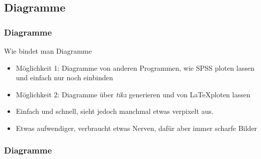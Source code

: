 \subsection{Diagramme}
\begin{frame}
  \frametitle{Diagramme}

  \begin{block}{Wie bindet man Diagramme}
    \begin{itemize}[<+->]
      \item Möglichkeit 1: Diagramme von anderen Programmen, wie SPSS ploten lassen und einfach nur noch einbinden
      \item Möglichkeit 2: Diagramme über \textit{tikz} generieren und von \LaTeX ploten lassen
      \item<1> {\color{red}Einfach und schnell, sieht jedoch manchmal etwas verpixelt aus.}
      \item<2> {\color{red}Etwas aufwendiger, verbraucht etwas Nerven, dafür aber immer scharfe Bilder}
    \end{itemize}
  \end{block}
\end{frame}
\begin{frame}
  \frametitle{Diagramme}

  \begin{example}
  \end{example}
\end{frame}
